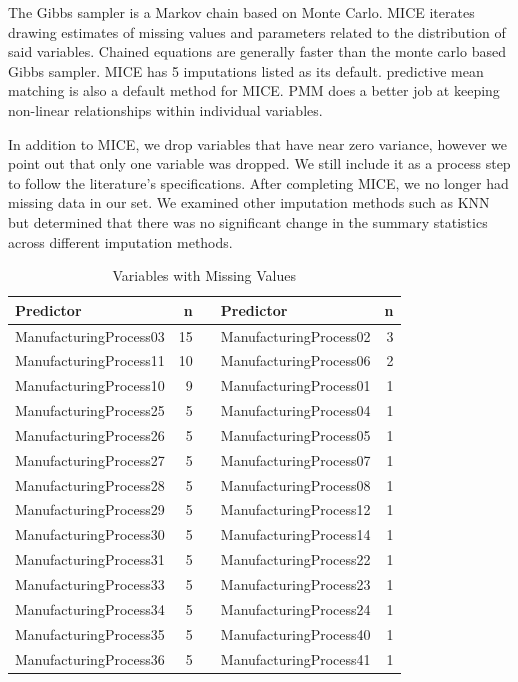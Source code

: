 \documentclass[]{report}
\begin{document}
The Gibbs sampler is a Markov chain based on Monte Carlo. MICE iterates
drawing estimates of missing values and parameters related to the
distribution of said variables. Chained equations are generally faster
than the monte carlo based Gibbs sampler. MICE has 5 imputations listed
as its default. predictive mean matching is also a default method for
MICE. PMM does a better job at keeping non-linear relationships within
individual variables.

In addition to MICE, we drop variables that have near zero variance,
however we point out that only one variable was dropped. We still
include it as a process step to follow the literature's specifications.
After completing MICE, we no longer had missing data in our set. We
examined other imputation methods such as KNN but determined that there
was no significant change in the summary statistics across different
imputation methods.

\begin{table}[H]

\caption{\label{tab:kj-6.3b}Variables with Missing Values}
\centering
\fontsize{8}{10}\selectfont
\begin{tabular}{lr>{\bfseries\raggedright\arraybackslash}p{0.1cm}lr}
\toprule
\textbf{Predictor} & \textbf{n} & \textbf{ } & \textbf{Predictor} & \textbf{n}\\
\midrule
\rowcolor{gray!6}  ManufacturingProcess03 & 15 &  & ManufacturingProcess02 & 3\\
ManufacturingProcess11 & 10 &  & ManufacturingProcess06 & 2\\
\rowcolor{gray!6}  ManufacturingProcess10 & 9 &  & ManufacturingProcess01 & 1\\
ManufacturingProcess25 & 5 &  & ManufacturingProcess04 & 1\\
\rowcolor{gray!6}  ManufacturingProcess26 & 5 &  & ManufacturingProcess05 & 1\\
\addlinespace
ManufacturingProcess27 & 5 &  & ManufacturingProcess07 & 1\\
\rowcolor{gray!6}  ManufacturingProcess28 & 5 &  & ManufacturingProcess08 & 1\\
ManufacturingProcess29 & 5 &  & ManufacturingProcess12 & 1\\
\rowcolor{gray!6}  ManufacturingProcess30 & 5 &  & ManufacturingProcess14 & 1\\
ManufacturingProcess31 & 5 &  & ManufacturingProcess22 & 1\\
\addlinespace
\rowcolor{gray!6}  ManufacturingProcess33 & 5 &  & ManufacturingProcess23 & 1\\
ManufacturingProcess34 & 5 &  & ManufacturingProcess24 & 1\\
\rowcolor{gray!6}  ManufacturingProcess35 & 5 &  & ManufacturingProcess40 & 1\\
ManufacturingProcess36 & 5 &  & ManufacturingProcess41 & 1\\
\bottomrule
\end{tabular}
\end{table}
\end{document}
